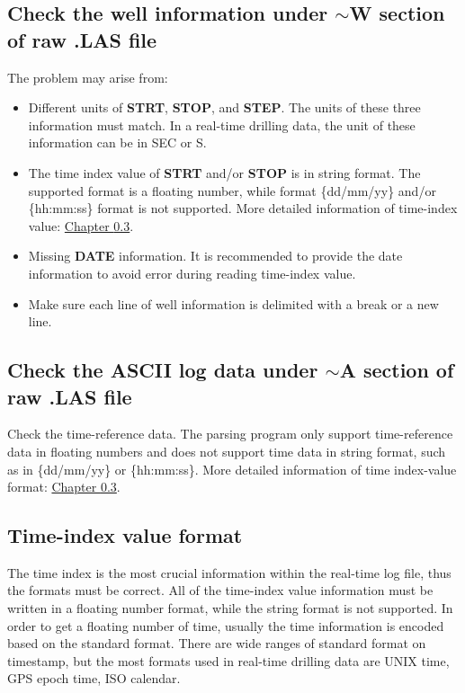 \documentclass[12pt,a4paper,oneside]{report}
\begin{document}
\begin{appendices}
\subsection{Check the well information under $\sim$W section of raw .LAS file}
The problem may arise from:
\begin{itemize}
\item Different units of \textbf{STRT}, \textbf{STOP}, and \textbf{STEP}. The units of these three information must match. In a real-time drilling data, the unit of these information can be in SEC or S.
\item The time index value of \textbf{STRT} and/or \textbf{STOP} is in string format. The supported format is a floating number, while format \{dd/mm/yy\} and/or \{hh:mm:ss\} format is not supported. More detailed information of time-index value: \hyperref[ch:time:index_value]{Chapter \ref{ch:time:index_value}}.
\item Missing \textbf{DATE} information. It is recommended to provide the date information to avoid error during reading time-index value.
\item Make sure each line of well information is delimited with a break or a new line.
\end{itemize}

\subsection{Check the ASCII log data under $\sim$A section of raw .LAS file}
Check the time-reference data. The parsing program only support time-reference data in floating numbers and does not support time data in string format, such as in \{dd/mm/yy\} or \{hh:mm:ss\}. More detailed information of time index-value format: \hyperref[ch:time:index_value]{Chapter \ref{ch:time:index_value}}.

\subsection{Time-index value format}
\label{ch:time:index_value}
The time index is the most crucial information within the real-time log file, thus the formats must be correct. All of the time-index value information must be written in a floating number format, while the string format is not supported. In order to get a floating number of time, usually the time information is encoded based on the standard format. There are wide ranges of standard format on timestamp, but the most formats used in real-time drilling data are UNIX time, GPS epoch time, ISO calendar. 


\end{appendices}
\end{document}
